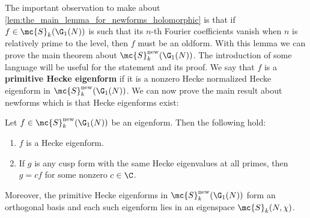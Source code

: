     The important observation to make about \cref{lem:the_main_lemma_for_newforms_holomorphic} is that if $f \in \mc{S}_{k}(\G_{1}(N))$ is such that its $n$-th Fourier coefficients vanish when $n$ is relatively prime to the level, then $f$ must be an oldform. With this lemma we can prove the main theorem about $\mc{S}_{k}^{\mathrm{new}}(\G_{1}(N))$. The introduction of some language will be useful for the statement and its proof. We say that $f$ is a \textbf{primitive Hecke eigenform} if it is a nonzero Hecke normalized Hecke eigenform in $\mc{S}_{k}^{\mathrm{new}}(\G_{1}(N))$. We can now prove the main result about newforms which is that Hecke eigenforms exist:

    \begin{theorem}\label{thm:newforms_characterization_holomorphic}
      Let $f \in \mc{S}_{k}^{\mathrm{new}}(\G_{1}(N))$ be an eigenform. Then the following hold:
      \begin{enumerate}[label=(\roman*)]
        \item $f$ is a Hecke eigenform.
        \item If $g$ is any cusp form with the same Hecke eigenvalues at all primes, then $g = cf$ for some nonzero $c \in \C$.
      \end{enumerate}
      Moreover, the primitive Hecke eigenforms in $\mc{S}_{k}^{\mathrm{new}}(\G_{1}(N))$ form an orthogonal basis and each such eigenform lies in an eigenspace $\mc{S}_{k}(N,\chi)$.
    \end{theorem}
